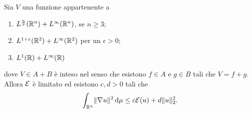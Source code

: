 \begin{teorema}
    Sia $V$ una funzione appartenente a
    \begin{enumerate}
        \item $\leb[\frac{n}2]{\R^n}+\leb[\infty]{\R^n}$, se $n\ge 3$;
        \item $\leb[1+\epsilon]{\R^2}+\leb[\infty]{\R^2}$ per un $\epsilon>0$;
        \item $\leb[1]{\R}+\leb[\infty]{\R}$
    \end{enumerate}
    dove $V\in A+B$ è inteso nel senso che esistono $f\in A$ e $g\in B$ tali che $V=f+g$.
    Allora $\E$ è limitato ed esistono $c,d>0$ tali che
    \begin{equation}
        \int_{\R^n}\norm{\grad u}^2\,\dd\mu\le c\E(u)+d\norm{u}_2^2.
    \end{equation}
\end{teorema}
